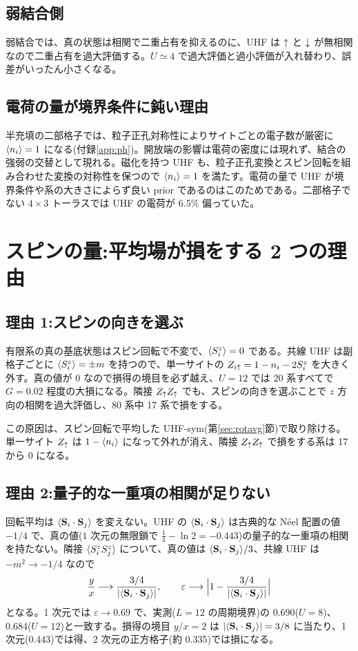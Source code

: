 \subsection{弱結合側}
弱結合では、真の状態は相関で二重占有を抑えるのに、UHF は $\uparrow$ と $\downarrow$ が無相関なので二重占有を過大評価する。$U\simeq4$ で過大評価と過小評価が入れ替わり、誤差がいったん小さくなる。

\subsection{電荷の量が境界条件に鈍い理由}
半充填の二部格子では、粒子正孔対称性によりサイトごとの電子数が厳密に $\langle n_i\rangle=1$ になる(付録\ref{app:ph})。開放端の影響は電荷の密度には現れず、結合の強弱の交替として現れる。磁化を持つ UHF も、粒子正孔変換とスピン回転を組み合わせた変換の対称性を保つので $\langle n_i\rangle=1$ を満たす。電荷の量で UHF が境界条件や系の大きさによらず良い prior であるのはこのためである。二部格子でない $4\times3$ トーラスでは UHF の電荷が 6.5\% 偏っていた。

\section{スピンの量:平均場が損をする 2 つの理由}
\label{sec:spin}

\subsection{理由 1:スピンの向きを選ぶ}
有限系の真の基底状態はスピン回転で不変で、$\langle S^z_i\rangle=0$ である。共線 UHF は副格子ごとに $\langle S^z_i\rangle=\pm m$ を持つので、単一サイトの $Z_{i\uparrow}=1-n_i-2S^z_i$ を大きく外す。真の値が 0 なので損得の境目を必ず越え、$U=12$ では 20 系すべてで $G=0.02$ 程度の大損になる。隣接 $Z_\uparrow Z_\uparrow$ でも、スピンの向きを選ぶことで $z$ 方向の相関を過大評価し、80 系中 17 系で損をする。

この原因は、スピン回転で平均した UHF-sym(第\ref{sec:rotavg}節)で取り除ける。単一サイト $Z_\uparrow$ は $1-\langle n_i\rangle$ になって外れが消え、隣接 $Z_\uparrow Z_\uparrow$ で損をする系は 17 から 0 になる。

\subsection{理由 2:量子的な一重項の相関が足りない}
回転平均は $\langle \mathbf S_i\cdot\mathbf S_j\rangle$ を変えない。UHF の $\langle \mathbf S_i\cdot\mathbf S_j\rangle$ は古典的な Néel 配置の値 $-1/4$ で、真の値($1$ 次元の無限鎖で $\frac14-\ln2=-0.443$)の量子的な一重項の相関を持たない。隣接 $\langle S^z_iS^z_j\rangle$ について、真の値は $\langle \mathbf S_i\cdot\mathbf S_j\rangle/3$、共線 UHF は $-m^2\to-1/4$ なので
\begin{equation}
  \frac yx\longrightarrow\frac{3/4}{\lvert\langle \mathbf S_i\cdot\mathbf S_j\rangle\rvert},\qquad
  \varepsilon\longrightarrow\Bigl\lvert1-\frac{3/4}{\lvert\langle \mathbf S_i\cdot\mathbf S_j\rangle\rvert}\Bigr\rvert
\end{equation}
となる。1 次元では $\varepsilon\to0.69$ で、実測($L=12$ の周期境界)の $0.690$($U=8$)、$0.684$($U=12$)と一致する。損得の境目 $y/x=2$ は $\lvert\langle \mathbf S_i\cdot\mathbf S_j\rangle\rvert=3/8$ に当たり、1 次元(0.443)では得、2 次元の正方格子(約 0.335)では損になる。

